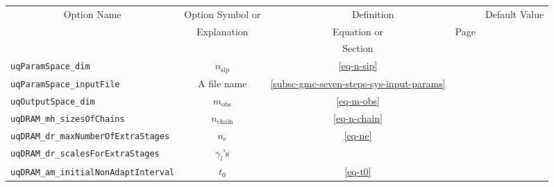\begin{sidewaystable}[h]
\begin{center}
\begin{tabular}{|l|c|c|c|c|}
\hline
\multicolumn{1}{|c|}{Option Name}        & Option Symbol or                  & \multicolumn{2}{c|}{Definition}                                                                 & Default Value \\
\cline{3-4}
                                         & Explanation                       & Equation or                                  & Page                                             &               \\
                                         &                                   & Section                                      &                                                  &               \\
\hline
\verb=uqParamSpace_dim=                  & $n_{\text{sip}}$                  & \eqref{eq-n-sip}                             & \pageref{eq-n-sip}                               &               \\
\hline
\verb=uqParamSpace_inputFile=            & A file name                       & \ref{subsc-gmc-seven-steps-sys-input-params} & \pageref{subsc-gmc-seven-steps-sys-input-params} &               \\
\hline
\verb=uqOutputSpace_dim=                 & $m_{\text{obs}}$                  & \eqref{eq-m-obs}                             & \pageref{eq-m-obs}                               &               \\
\hline
\verb=uqDRAM_mh_sizesOfChains=           & $n_{\text{chain}}$                & \eqref{eq-n-chain}                           & \pageref{eq-n-chain}                             &               \\
\hline
\verb=uqDRAM_dr_maxNumberOfExtraStages=  & $n_e$                             & \eqref{eq-ne}                                & \pageref{eq-ne}                                  &               \\
\hline
\verb=uqDRAM_dr_scalesForExtraStages=    & $\gamma_l$'s                      &                                              &                                                  &               \\
\hline
\verb=uqDRAM_am_initialNonAdaptInterval= & $t_0$                             & \eqref{eq-t0}                                & \pageref{eq-t0}                                  &               \\
\hline

\end{tabular}
\end{center}
\end{sidewaystable}
